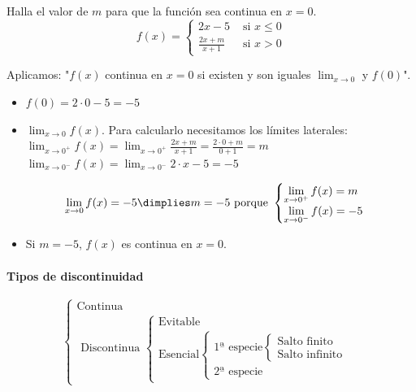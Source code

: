 \begin{problem}
Halla el valor de $m$ para que la función sea continua en $x=0$.
\[f(x) = 
	\begin{cases}
		2x-5 & \text{ si }x\leq 0\\ 
		\frac{2x+m}{x+1} & \text{ si } x>0
	\end{cases}\]
\solution

Aplicamos: "$f(x)$ continua en $x=0$ si existen y son iguales $\displaystyle\lim_{x\to 0}$ y $f(0)$".

\begin{itemize}
	\item $f(0) =  2·0-5 = -5$
	\item $\displaystyle\lim_{x\to0} f(x)$. Para calcularlo necesitamos los límites laterales:
	\subitem $\displaystyle\lim_{x\to0^+} f(x) = \lim_{x\to0^+} \frac{2x+m}{x+1} = \frac{2·0+m}{0+1} = m$
	\subitem $\displaystyle\lim_{x\to0^-} f(x) = \lim_{x\to0^-} 2·x-5 = -5$

	\[\lim_{x\to 0} f(x) = -5 \dimplies m=-5 \text{ porque } \begin{cases}\displaystyle\lim_{x\to0^+}f(x) = m\\ \displaystyle\lim_{x\to0^-}f(x) = -5\end{cases}\]
	\item Si $m=-5$, $f(x)$ es continua en $x=0$.
\end{itemize}

\end{problem}

\paragraph{Tipos de discontinuidad}

\[
\begin{cases} 
	\text{Continua}\\
	\text{ Discontinua }
		\begin{cases}
			\text{Evitable}\\
			\text{Esencial}
				\begin{cases}
					\text{1ª especie}
						\begin{cases}
							\text{Salto finito}\\
							\text{Salto infinito}
						\end{cases}\\
					\text{2ª especie}
				\end{cases}
		\end{cases}
\end{cases}
\]

